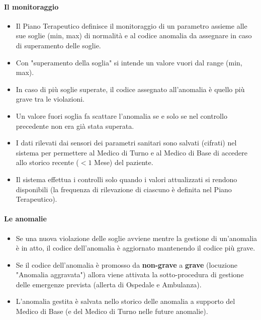 \documentclass[a4paper,11pt,oneside, table]{article}
\begin{document}
\paragraph{Il monitoraggio}
\begin{itemize}
  \item Il Piano Terapeutico definisce il monitoraggio di un parametro assieme alle sue soglie (min, max) di normalit\`a e al codice anomalia da assegnare in caso di superamento delle soglie.
  \item Con "superamento della soglia" si intende un valore vuori dal range (min, max).
  \item In caso di pi\`u soglie superate, il codice assegnato all'anomalia \`e quello pi\`u grave tra le violazioni.
  \item Un valore fuori soglia fa scattare l'anomalia se e solo se nel controllo precedente non era gi\`a stata superata.
  \item I dati rilevati dai sensori dei parametri sanitari sono salvati (cifrati) nel sistema per permettere al Medico di Turno e al Medico di Base di accedere allo storico recente ($< 1$ Mese) del paziente.
  \item Il sistema effettua i controlli solo quando i valori attualizzati si rendono disponibili (la frequenza di rilevazione di ciascuno \`e definita nel Piano Terapeutico).
\end{itemize}

\paragraph{Le anomalie}
\begin{itemize}
  \item Se una nuova violazione delle soglie avviene mentre la gestione di un'anomalia \`e in atto, il codice dell'anomalia \`e aggiornato mantenendo il codice pi\`u grave.
  \item Se il codice dell'anomalia \`e promosso da \textbf{non-grave} a \textbf{grave} (locuzione "Anomalia aggravata") allora viene attivata la sotto-procedura di gestione delle emergenze prevista (allerta di Ospedale e Ambulanza).
  \item L'anomalia gestita \`e salvata nello storico delle anomalia a supporto del Medico di Base (e del Medico di Turno nelle future anomalie).
\end{itemize}
\end{document}
